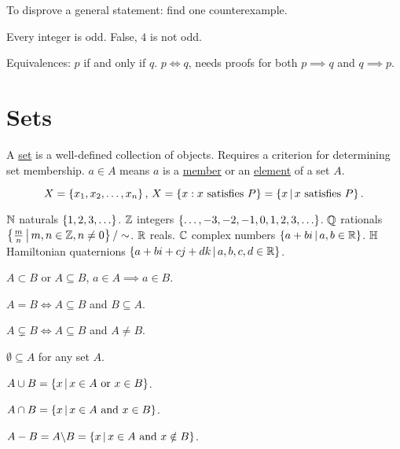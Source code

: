 \documentclass[]{article}
\begin{document}
To disprove a general statement: find one counterexample.

\begin{example}
	Every integer is odd. False, $4$ is not odd.
\end{example}

Equivalences: $p$ if and only if $q$. $p\Longleftrightarrow q$, needs proofs for both $p\implies q$ and $q\implies p$.

\section{Sets}

A \ul{set} is a well-defined collection of objects. Requires a criterion for determining set membership. $a\in A$ means $a$ is a \ul{member} or an \ul{element} of a set $A$.

$$X = \left\{  x_1,x_2,\dots,x_n \right\}, \, X = \left\{ x : x \text{ satisfies } P \right\} = \left\{ x \, \middle| \, x \text{ satisfies } P \right\}.$$

$\mathbb{N}$ naturals $\set{1,2,3,\dots}$.
$\mathbb{Z}$ integers $\set{\dots,-3,-2,-1,0,1,2,3,\dots}$.
$\mathbb{Q}$ rationals $\left\{ \frac{m}{n} \, \middle| \, m,n\in \mathbb{Z}, n\neq 0 \right\}/\sim$.
$\mathbb{R}$ reals.
$\mathbb{C}$ complex numbers $\left\{ a+bi \, \middle| \, a,b\in\mathbb{R} \right\}$.
$\mathbb{H}$ Hamiltonian quaternions $\left\{ a+bi+cj+dk \, \middle| \, a,b,c,d\in\mathbb{R} \right\}$.

\begin{definition}
	[Subset] $A\subset B$ or $A\subseteq B$, $a\in A \implies a\in B$.
\end{definition}
\begin{definition}
	$A = B \Longleftrightarrow A \subseteq B$ and $B\subseteq A$.
\end{definition}

\begin{definition}
	 $A\subsetneq B \Longleftrightarrow A\subseteq B$ and $A\neq B$.
\end{definition}
\begin{definition}
	 $\emptyset \subseteq A$ for any set $A$.
\end{definition}

\begin{definition}
	[Union] $A\cup B = \left\{ x \, \middle| \, x\in A \text{ or } x\in B \right\}$.
\end{definition}
\begin{definition}
	[Intersection] $A\cap B = \left\{ x \, \middle| \, x\in A\text{ and } x\in B \right\}$.
\end{definition}
\begin{definition}
	[Difference] $A-B = A\backslash B = \left\{ x \, \middle| \, x\in A \text{ and } x\notin B \right\}$.
\end{definition}
\end{document}
